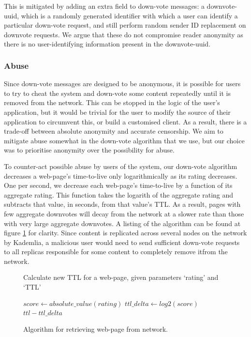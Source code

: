 This is mitigated by adding an extra field to down-vote messages: a downvote-uuid, which is a randomly generated identifier with which a user can identify a
particular down-vote request, and still perform random sender ID replacement on downvote requests. We argue that these do not compromise reader anonymity
as there is no user-identifying information present in the downvote-uuid.

\subsubsection{Abuse}

Since down-vote messages are designed to be anonymous, it is possible for users to try to cheat the system and down-vote some content repeatedly until it is
removed from the network. This can be stopped in the logic of the user's application, but it would be trivial for the user to modify the source of their application
to circumvent this, or build a customised client. As a result, there is a trade-off between absolute anonymity and accurate censorship. We aim to mitigate
abuse somewhat in the down-vote algorithm that we use, but our choice was to prioritise anonymity over the possibility for abuse.

To counter-act possible abuse by users of the system, our down-vote algorithm decreases a web-page's time-to-live only logarithmically as its rating decreases.
One per second, we decrease each web-page's time-to-live by a function of its aggregate rating. This function takes the logarith of the aggregate rating and
subtracts that value, in seconds, from that value's TTL. As a result, pages with few aggregate downvotes will decay from the network at a slower rate than
those with very large aggregate downvotes. A listing of the algorithm can be found at figure \ref{fig:downvotealgo} for clarity.
Since content is replicated across several nodes on the network by Kademlia, a malicious user would need to send sufficient down-vote requests to all replicas
responsible for some content to completely remove itfrom the network.

\begin{figure}
    \begin{algorithm}[H]
        \caption{Calculate new TTL for a web-page, given parameters `rating' and `TTL'}
        \begin{algorithmic}
        \ENDIF
        \STATE $ score \leftarrow absolute\_value(rating) $
        \STATE $ ttl\_delta \leftarrow log2(score) $
        \RETURN $ ttl - ttl\_delta $
        \end{algorithmic}
    \end{algorithm}
    \caption{Algorithm for retrieving web-page from network.}
    \label{fig:downvotealgo}
\end{figure}
